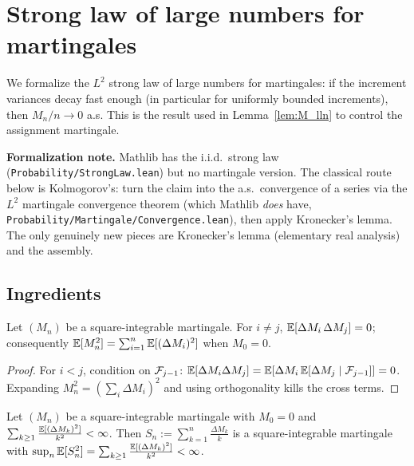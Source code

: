 \chapter{Strong law of large numbers for martingales}
\label{chap:pre_slln}

We formalize the $L^2$ strong law of large numbers for martingales: if the
increment variances decay fast enough (in particular for uniformly bounded
increments), then $M_n / n \to 0$ a.s. This is the result used in
Lemma~\ref{lem:M_lln} to control the assignment martingale.

\textbf{Formalization note.} Mathlib has the i.i.d.\ strong law
(\texttt{Probability/StrongLaw.lean}) but no martingale version. The classical
route below is Kolmogorov's: turn the claim into the a.s.\ convergence of a
series via the $L^2$ martingale convergence theorem (which Mathlib \emph{does}
have, \texttt{Probability/Martingale/Convergence.lean}), then apply Kronecker's
lemma. The only genuinely new pieces are Kronecker's lemma (elementary real
analysis) and the assembly.

\section{Ingredients}
\label{sec:pre_slln_ingredients}

\begin{lemma}\label{lem:slln_orthogonal}
Let $(M_n)$ be a square-integrable martingale. For $i \ne j$,
$\mathbb{E}[\Delta M_i\, \Delta M_j] = 0$; consequently
$\mathbb{E}[M_n^2] = \sum_{i=1}^n \mathbb{E}[(\Delta M_i)^2]$ when $M_0 = 0$.
\end{lemma}

\begin{proof}
For $i < j$, condition on $\mathcal{F}_{j-1}$: $\mathbb{E}[\Delta M_i \Delta M_j]
= \mathbb{E}[\Delta M_i\, \mathbb{E}[\Delta M_j\mid\mathcal{F}_{j-1}]] = 0$. Expanding
$M_n^2 = (\sum_i \Delta M_i)^2$ and using orthogonality kills the cross terms.
\end{proof}

\begin{lemma}\label{lem:slln_weighted}
Let $(M_n)$ be a square-integrable martingale with $M_0=0$ and
$\sum_{k\ge1}\frac{\mathbb{E}[(\Delta M_k)^2]}{k^2} < \infty$. Then
$S_n := \sum_{k=1}^n \frac{\Delta M_k}{k}$ is a square-integrable martingale with
$\sup_n \mathbb{E}[S_n^2] = \sum_{k\ge1}\frac{\mathbb{E}[(\Delta M_k)^2]}{k^2} < \infty$.
\end{lemma}

